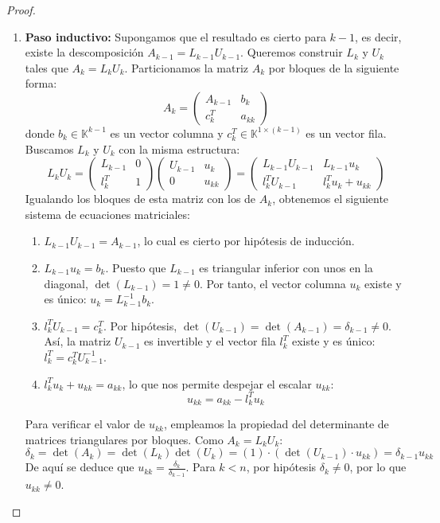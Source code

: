 \begin{proof}
\begin{enumerate}
        \item \textbf{Paso inductivo:} Supongamos que el resultado es cierto para $k-1$, es decir, existe la descomposición $A_{k-1} = L_{k-1} U_{k-1}$. Queremos construir $L_k$ y $U_k$ tales que $A_k = L_k U_k$. Particionamos la matriz $A_k$ por bloques de la siguiente forma:
        \[
        A_k =
        \left(
        \begin{array}{c|c}
            A_{k-1} & b_k \\ \hline
            c_k^T & a_{kk}
        \end{array}
        \right)
        \]
        donde $b_k \in \mathbb{K}^{k-1}$ es un vector columna y $c_k^T \in \mathbb{K}^{1 \times (k-1)}$ es un vector fila. Buscamos $L_k$ y $U_k$ con la misma estructura:
        \[
        L_k U_k =
        \left(
        \begin{array}{c|c}
            L_{k-1} & 0 \\ \hline
            l_k^T & 1
        \end{array}
        \right)
        \left(
        \begin{array}{c|c}
            U_{k-1} & u_k \\ \hline
            0 & u_{kk}
        \end{array}
        \right)
        =
        \left(
        \begin{array}{c|c}
            L_{k-1} U_{k-1} & L_{k-1} u_k \\ \hline
            l_k^T U_{k-1} & l_k^T u_k + u_{kk}
        \end{array}
        \right)
        \]
        Igualando los bloques de esta matriz con los de $A_k$, obtenemos el siguiente sistema de ecuaciones matriciales:
        \begin{enumerate}
            \item $L_{k-1} U_{k-1} = A_{k-1}$, lo cual es cierto por hipótesis de inducción.
            \item $L_{k-1} u_k = b_k$. Puesto que $L_{k-1}$ es triangular inferior con unos en la diagonal, $\det(L_{k-1}) = 1 \neq 0$. Por tanto, el vector columna $u_k$ existe y es único: $u_k = L_{k-1}^{-1} b_k$.
            \item $l_k^T U_{k-1} = c_k^T$. Por hipótesis, $\det(U_{k-1}) = \det(A_{k-1}) = \delta_{k-1} \neq 0$. Así, la matriz $U_{k-1}$ es invertible y el vector fila $l_k^T$ existe y es único: $l_k^T = c_k^T U_{k-1}^{-1}$.
            \item $l_k^T u_k + u_{kk} = a_{kk}$, lo que nos permite despejar el escalar $u_{kk}$:
            \[
                u_{kk} = a_{kk} - l_k^T u_k
            \]
        \end{enumerate}
        Para verificar el valor de $u_{kk}$, empleamos la propiedad del determinante de matrices triangulares por bloques. Como $A_k = L_k U_k$:
        \[
            \delta_k = \det(A_k) = \det(L_k) \det(U_k) = (1) \cdot \left( \det(U_{k-1}) \cdot u_{kk} \right) = \delta_{k-1} u_{kk}
        \]
        De aquí se deduce que $u_{kk} = \frac{\delta_k}{\delta_{k-1}}$. Para $k < n$, por hipótesis $\delta_k \neq 0$, por lo que $u_{kk} \neq 0$. 
        

\end{enumerate}
\end{proof}
